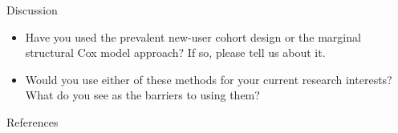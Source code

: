 \documentclass[aspectratio=169,12pt]{beamer} %
\begin{document}
\begin{frame}{Discussion}
    \begin{itemize}
	\item Have you used the prevalent new-user cohort design or the marginal structural Cox model approach? If so, please tell us about it.
    	\item Would you use either of these methods for your current research interests? What do you see as the barriers to using them?
    \end{itemize}
\end{frame}

\begin{frame}{References}
        \tiny
        
\end{frame}
\end{document}
